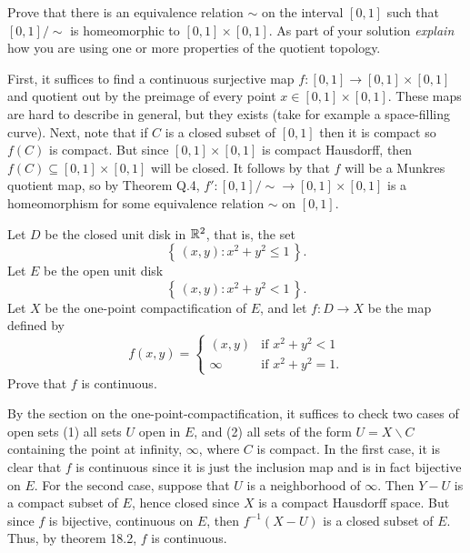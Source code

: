 \begin{problem}
Prove that there is an equivalence relation $\sim$ on the interval $[0,1]$
such that $[0,1]/{\sim}$ is homeomorphic to $[0,1]\times[0,1]$. As part of
your solution \emph{explain} how you are using one or more properties of the
quotient topology.
\end{problem}
\begin{solution}
First, it suffices to find a continuous surjective map $f\colon[0,1]\to
[0,1]\times[0,1]$ and quotient out by the preimage of every point
$x\in[0,1]\times[0,1]$. These maps are hard to describe in general, but
they exists (take for example a space-filling curve). Next, note that if
$C$ is a closed subset of $[0,1]$ then it is compact so $f(C)$ is
compact. But since $[0,1]\times[0,1]$ is compact Hausdorff, then
$f(C)\subseteq[0,1]\times[0,1]$ will be closed. It follows by that $f$ will
be a Munkres quotient map, so by Theorem Q.4, $f'\colon
[0,1]/{\sim}\to[0,1]\times[0,1]$ is a homeomorphism for some equivalence
relation $\sim$ on $[0,1]$.
\end{solution}

\begin{problem}
Let $D$ be the closed unit disk in $\mathbb{R}^2$, that is, the set
\[
\left\{\,(x,y):x^2+y^2\leq 1\,\right\}.
\]
Let $E$ be the open unit disk
\[
\left\{\,(x,y):x^2+y^2<1\,\right\}.
\]
Let $X$ be the one-point compactification of $E$, and let $f\colon D\to X$
be the map defined by
\[
f(x,y)=
\begin{cases}
(x,y)&\text{if $x^2+y^2<1$}\\
\infty&\text{if $x^2+y^2=1$.}
\end{cases}
\]
Prove that $f$ is continuous.
\end{problem}
\begin{solution}
By the section on the one-point-compactification, it suffices to check two
cases of open sets (1) all sets $U$ open in $E$, and (2) all sets of the
form $U=X\smallsetminus C$ containing the point at infinity, $\infty$, where $C$ is
compact. In the first case, it is clear that $f$ is continuous since it is
just the inclusion map and is in fact bijective on $E$. For the second
case, suppose that $U$ is a neighborhood of $\infty$. Then $Y-U$ is a
compact subset of $E$, hence closed since $X$ is a compact Hausdorff
space. But since $f$ is bijective, continuous on $E$, then $f^{-1}(X-U)$ is
a closed subset of $E$. Thus, by theorem 18.2, $f$ is continuous.
\end{solution}

